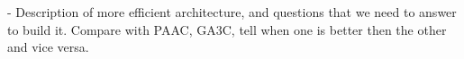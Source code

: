- Description of more efficient architecture, and questions that we need to
  answer to build it. Compare with PAAC, GA3C, tell when one is better then
  the other and vice versa.
